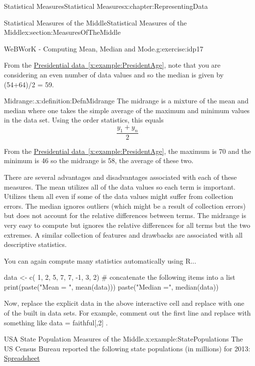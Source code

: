 \documentclass[oneside,10pt,]{book}
\newcommand{\xreffont}{\relax}
\numberwithin{equation}{section}
\begin{document}
\begin{chapterptx}{Statistical Measures}{}{Statistical Measures}{}{}{x:chapter:RepresentingData}
\begin{sectionptx}{Statistical Measures of the Middle}{}{Statistical Measures of the Middle}{}{}{x:section:MeasuresOfTheMiddle}
\begin{inlineexercise}{WeBWorK - Computing Mean, Median and Mode.}{g:exercise:idp17}
\end{inlineexercise}%
From the \hyperref[x:example:PresidentAge]{Presidential data~{\xreffont\ref{x:example:PresidentAge}}}, note that you are considering an even number of data values and so the median is given by (54+64)\slash{}2 = 59.%
\par
\begin{definition}{Midrange:.}{x:definition:DefnMidrange}%
The midrange is a mixture of the mean and median where one takes the simple average of the maximum and minimum values in the data set. Using the order statistics, this equals%
\begin{equation*}
\frac{y_1+y_n}{2}
\end{equation*}
%
\end{definition}
%
\par
From the \hyperref[x:example:PresidentAge]{Presidential data~{\xreffont\ref{x:example:PresidentAge}}}, the maximum is 70 and the minimum is 46 so the midrange is 58, the average of these two.%
\par
There are several advantages and disadvantages associated with each of these measures. The mean utilizes all of the data values so each term is important. Utilizes them all even if some of the data values might suffer from collection errors. The median ignores outliers (which might be a result of collection errors) but does not account for the relative differences between terms. The midrange is very easy to compute but ignores the relative differences for all terms but the two extremes. A similar collection of features and drawbacks are associated with all descriptive statistics.%
\par
You can again compute many statistics automatically using R... \leavevmode%
\begin{sageinput}
data <- c( 1, 2, 5, 7, 7, -1, 3, 2)   # concatenate the following items into a list
print(paste("Mean = ", mean(data)))
paste("Median =", median(data))
\end{sageinput}
%
\par
Now, replace the explicit data in the above interactive cell and replace with one of the built in data sets.  For example, comment out the first line and replace with something like data = faithful[,2] .%
\par
\begin{example}{USA State Population Measures of the Middle.}{x:example:StatePopulations}%
The US Census Bureau reported the following state populations (in millions) for 2013: \href{Data/USA_States_Populations_2014.xlsx}{Spreadsheet}%

\end{example}
\end{sectionptx}
\end{chapterptx}
\end{document}
